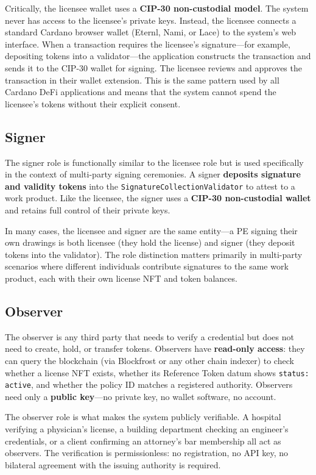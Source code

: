 Critically, the licensee wallet uses a \textbf{CIP-30 non-custodial model}. The system never has access to the licensee's private keys. Instead, the licensee connects a standard Cardano browser wallet (Eternl, Nami, or Lace) to the system's web interface. When a transaction requires the licensee's signature---for example, depositing tokens into a validator---the application constructs the transaction and sends it to the CIP-30 wallet for signing. The licensee reviews and approves the transaction in their wallet extension. This is the same pattern used by all Cardano DeFi applications and means that the system cannot spend the licensee's tokens without their explicit consent.

\subsection{Signer}

The signer role is functionally similar to the licensee role but is used specifically in the context of multi-party signing ceremonies. A signer \textbf{deposits signature and validity tokens} into the \texttt{SignatureCollectionValidator} to attest to a work product. Like the licensee, the signer uses a \textbf{CIP-30 non-custodial wallet} and retains full control of their private keys.

In many cases, the licensee and signer are the same entity---a PE signing their own drawings is both licensee (they hold the license) and signer (they deposit tokens into the validator). The role distinction matters primarily in multi-party scenarios where different individuals contribute signatures to the same work product, each with their own license NFT and token balances.

\subsection{Observer}

The observer is any third party that needs to verify a credential but does not need to create, hold, or transfer tokens. Observers have \textbf{read-only access}: they can query the blockchain (via Blockfrost or any other chain indexer) to check whether a license NFT exists, whether its Reference Token datum shows \texttt{status: active}, and whether the policy ID matches a registered authority. Observers need only a \textbf{public key}---no private key, no wallet software, no account.

The observer role is what makes the system publicly verifiable. A hospital verifying a physician's license, a building department checking an engineer's credentials, or a client confirming an attorney's bar membership all act as observers. The verification is permissionless: no registration, no API key, no bilateral agreement with the issuing authority is required.

